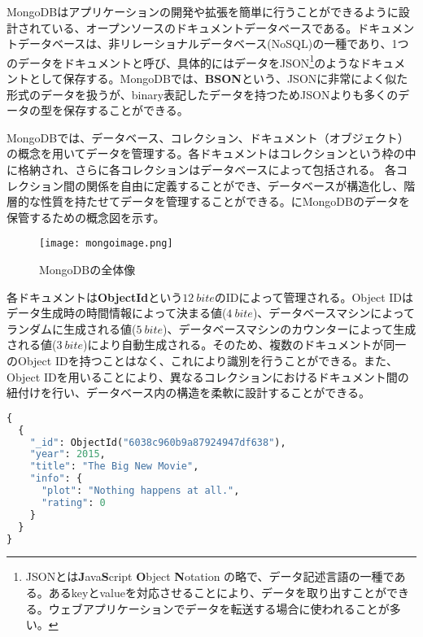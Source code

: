 MongoDBはアプリケーションの開発や拡張を簡単に行うことができるように設計されている、オープンソースのドキュメントデータベースである。ドキュメントデータベースは、非リレーショナルデータベース(NoSQL)の一種であり、1つのデータをドキュメントと呼び、具体的にはデータをJSON\footnote{JSONとは\textbf{J}ava\textbf{S}cript \textbf{O}bject \textbf{N}otation の略で、データ記述言語の一種である。あるkeyとvalueを対応させることにより、データを取り出すことができる。ウェブアプリケーションでデータを転送する場合に使われることが多い。}のようなドキュメントとして保存する。MongoDBでは、\textbf{BSON}という、JSONに非常によく似た形式のデータを扱うが、binary表記したデータを持つためJSONよりも多くのデータの型を保存することができる。

MongoDBでは、データベース、コレクション、ドキュメント（オブジェクト）の概念を用いてデータを管理する。各ドキュメントはコレクションという枠の中に格納され、さらに各コレクションはデータベースによって包括される。
各コレクション間の関係を自由に定義することができ、データベースが構造化し、階層的な性質を持たせてデータを管理することができる。にMongoDBのデータを保管するための概念図を示す。

\begin{figure}[tbp]
  \centering
  \texttt{[image: mongoimage.png]}
  \caption[MongoDBの全体像]{MongoDBの全体像}
  \label{fig:localdb-collection}
\end{figure}

各ドキュメントは\textbf{ObjectId}という$12\ \si{bite}$のIDによって管理される。Object IDはデータ生成時の時間情報によって決まる値($4\ \si{bite}$)、データベースマシンによってランダムに生成される値($5\ \si{bite}$)、データベースマシンのカウンターによって生成される値($3\ \si{bite}$)により自動生成される。そのため、複数のドキュメントが同一のObject IDを持つことはなく、これにより識別を行うことができる。また、Object IDを用いることにより、異なるコレクションにおけるドキュメント間の紐付けを行い、データベース内の構造を柔軟に設計することができる。

\begin{lstlisting}[caption=MongoDBのドキュメントの例,label=fuga, language=Python]
{
  {
    "_id": ObjectId("6038c960b9a87924947df638"),
    "year": 2015,
    "title": "The Big New Movie",
    "info": {
      "plot": "Nothing happens at all.",
      "rating": 0
    }
  }
}
\end{lstlisting}


